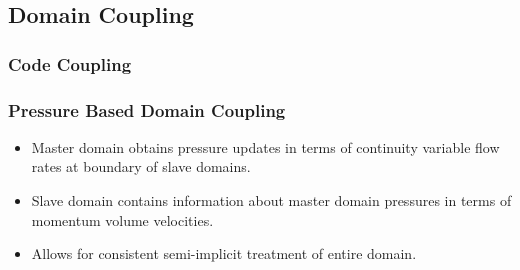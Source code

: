 \documentclass[compress,xcolor=table]{beamer}
\begin{document}
\subsection[Domain Coupling]{Domain Coupling}
\begin{frame}
\frametitle{Code Coupling}

\begin{figure}[h!t]
\centering
\resizebox{1.0\textwidth}{!}{

}
\end{figure}
\end{frame}
\begin{frame}
\frametitle{Pressure Based Domain Coupling}

\begin{itemize}
\item{Master domain obtains pressure updates in terms of continuity variable flow rates at boundary of slave domains.}
\item{Slave domain contains information about master domain pressures in terms of momentum volume velocities.}
\item{Allows for consistent semi-implicit treatment of entire domain.}
\end{itemize}

\end{frame}
\end{document}
